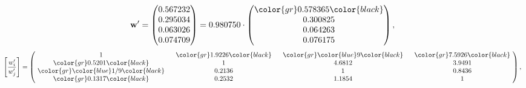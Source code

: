 \begin{example}
\begin{equation*}
\mathbf{w}^{\prime} =
\begin{pmatrix}
0.567232\\
0.295034\\
0.063026\\
0.074709
\end{pmatrix} =
0.980750\cdot
\begin{pmatrix}
\color{gr} 0.578365\color{black} \\
0.300825\\
0.064263\\
0.076175
\end{pmatrix},
\end{equation*}
\begin{equation*}
\left[ \frac{{w}^{\prime}_i}{{w}^{\prime}_j} \right] =
\begin{pmatrix}
$\,\,$ 1 $\,\,$ & $\,\,$\color{gr} 1.9226\color{black} $\,\,$ & $\,\,$\color{gr} \color{blue} 9\color{black} $\,\,$ & $\,\,$\color{gr} 7.5926\color{black} $\,\,$ \\
$\,\,$\color{gr} 0.5201\color{black} $\,\,$ & $\,\,$ 1 $\,\,$ & $\,\,$4.6812$\,\,$ & $\,\,$3.9491  $\,\,$ \\
$\,\,$\color{gr} \color{blue}  1/9\color{black} $\,\,$ & $\,\,$0.2136$\,\,$ & $\,\,$ 1 $\,\,$ & $\,\,$0.8436 $\,\,$ \\
$\,\,$\color{gr} 0.1317\color{black} $\,\,$ & $\,\,$0.2532$\,\,$ & $\,\,$1.1854$\,\,$ & $\,\,$ 1  $\,\,$ \\
\end{pmatrix},
\end{equation*}
\end{example}
\newpage
